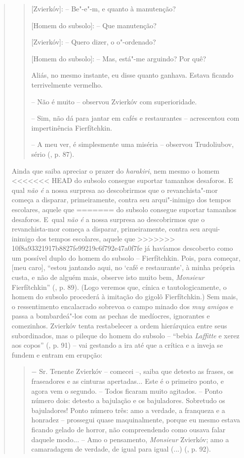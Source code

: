 {\begin{quote}
\begin{quote}
{[}Zvierkóv{]}: -- Be"-e"-m, e quanto à manutenção?

{[}Homem do subsolo{]}: -- Que manutenção?

{[}Zvierkóv{]}: -- Quero dizer, o o"-ordenado?

{[}Homem do subsolo{]}: -- Mas, está"-me arguindo? Por quê?

Aliás, no mesmo instante, eu disse quanto ganhava. Estava ficando
terrivelmente vermelho.

-- Não é muito -- observou Zvierkóv com superioridade.

-- Sim, não dá para jantar em cafés e restaurantes -- acrescentou com
impertinência Fierfítchkin.

-- A meu ver, é simplesmente uma miséria -- observou Trudoliubov, sério
(, p. 87).
\end{quote}

Ainda que saiba apreciar o prazer do \emph{harakiri}, nem mesmo o homem
<<<<<<< HEAD
do subsolo consegue suportar tamanhos desaforos. E qual \emph{não é} a
nossa surpresa ao descobrirmos que o revanchista"-mor começa a disparar,
primeiramente, contra seu arqui"-inimigo dos tempos escolares, aquele que
=======
do subsolo consegue suportar tamanhos desaforos. E~qual \emph{não é} a
nossa surpresa ao descobrirmos que o revanchista-mor começa a disparar,
primeiramente, contra seu arqui-inimigo dos tempos escolares, aquele que
>>>>>>> 10f8a93321917b8827fe99219c6f792e47a0f7fe
já havíamos descoberto como um possível duplo do homem do subsolo --
Fierfítchkin. Pois, para começar, {[}meu caro{]}, ``estou jantando aqui,
no `café e restaurante', à minha própria custa, e não de alguém mais,
observe isto muito bem, \emph{Monsieur} Fierfítchkin'' (, p. 89).
(Logo veremos que, cínica e tautologicamente, o homem do subsolo
procederá à imitação do gigolô Fierfítchkin.) Sem mais, o ressentimento
encalacrado sobrevoa o campo minado dos \emph{muy amigos} e passa a
bombardeá"-los com as pechas de medíocres, ignorantes e comezinhos.
Zvierkóv tenta restabelecer a ordem hierárquica entre seus subordinados,
mas o pileque do homem do subsolo -- ``bebia \emph{Laffitte} e xerez aos
copos'' (, p. 91) -- vai gestando a ira até que a crítica e a inveja
se fundem e entram em erupção:

\begin{quote}
− Sr. Tenente Zvierkóv -- comecei --, saiba que detesto as frases, os
fraseadores e as cinturas apertadas... Este é o primeiro ponto, e agora
vem o segundo. -- Todos ficaram muito agitados. -- Ponto número dois:
detesto a bajulação e os bajuladores. Sobretudo os bajuladores! Ponto
número três: amo a verdade, a franqueza e a honradez -- prossegui quase
maquinalmente, porque eu mesmo estava ficando gelado de horror, não
compreendendo como ousava falar daquele modo... -- Amo o pensamento,
\emph{Monsieur} Zvierkóv; amo a camaradagem de verdade, de igual para
igual (...) (, p. 92).
\end{quote}


\end{quote}}
